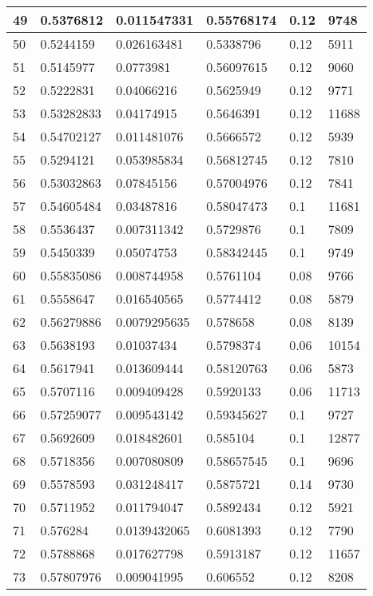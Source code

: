 \begin{longtable}{|l|l|l|l|l|l|}
49 & 0.5376812 & 0.011547331 & 0.55768174 & 0.12 & 9748 \\ \hline 
50 & 0.5244159 & 0.026163481 & 0.5338796 & 0.12 & 5911 \\ \hline 
51 & 0.5145977 & 0.0773981 & 0.56097615 & 0.12 & 9060 \\ \hline 
52 & 0.5222831 & 0.04066216 & 0.5625949 & 0.12 & 9771 \\ \hline 
53 & 0.53282833 & 0.04174915 & 0.5646391 & 0.12 & 11688 \\ \hline 
54 & 0.54702127 & 0.011481076 & 0.5666572 & 0.12 & 5939 \\ \hline 
55 & 0.5294121 & 0.053985834 & 0.56812745 & 0.12 & 7810 \\ \hline 
56 & 0.53032863 & 0.07845156 & 0.57004976 & 0.12 & 7841 \\ \hline 
57 & 0.54605484 & 0.03487816 & 0.58047473 & 0.1 & 11681 \\ \hline 
58 & 0.5536437 & 0.007311342 & 0.5729876 & 0.1 & 7809 \\ \hline 
59 & 0.5450339 & 0.05074753 & 0.58342445 & 0.1 & 9749 \\ \hline 
60 & 0.55835086 & 0.008744958 & 0.5761104 & 0.08 & 9766 \\ \hline 
61 & 0.5558647 & 0.016540565 & 0.5774412 & 0.08 & 5879 \\ \hline 
62 & 0.56279886 & 0.0079295635 & 0.578658 & 0.08 & 8139 \\ \hline 
63 & 0.5638193 & 0.01037434 & 0.5798374 & 0.06 & 10154 \\ \hline 
64 & 0.5617941 & 0.013609444 & 0.58120763 & 0.06 & 5873 \\ \hline 
65 & 0.5707116 & 0.009409428 & 0.5920133 & 0.06 & 11713 \\ \hline 
66 & 0.57259077 & 0.009543142 & 0.59345627 & 0.1 & 9727 \\ \hline 
67 & 0.5692609 & 0.018482601 & 0.585104 & 0.1 & 12877 \\ \hline 
68 & 0.5718356 & 0.007080809 & 0.58657545 & 0.1 & 9696 \\ \hline 
69 & 0.5578593 & 0.031248417 & 0.5875721 & 0.14 & 9730 \\ \hline 
70 & 0.5711952 & 0.011794047 & 0.5892434 & 0.12 & 5921 \\ \hline 
71 & 0.576284 & 0.0139432065 & 0.6081393 & 0.12 & 7790 \\ \hline 
72 & 0.5788868 & 0.017627798 & 0.5913187 & 0.12 & 11657 \\ \hline 
73 & 0.57807976 & 0.009041995 & 0.606552 & 0.12 & 8208 \\ \hline 

\end{longtable}
